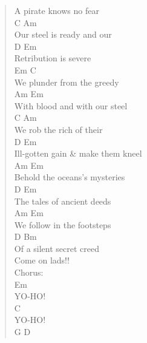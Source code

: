 \documentclass[11pt]{article}
\begin{document}
\begin{verse}
A pirate knows no fear\\
\hspace*{4em}C              Am\\
Our steel is ready and our\\
\hspace*{5em}D            Em\\
Retribution is severe\\
\vspace*{1em}
\vspace*{1em}
\hspace*{3em}Em               C\\
We plunder from the greedy\\
\hspace*{5em}Am                 Em\\
With blood and with our steel\\
\hspace*{3em}C               Am\\
We rob the rich of their\\
\hspace*{11em}D                Em\\
Ill-gotten gain \& make them kneel\\
\vspace*{1em}
\hspace*{2em}Am                    Em\\
Behold the oceans's mysteries\\
\hspace*{4em}D                Em\\
The tales of ancient deeds\\
\hspace*{3em}Am            Em\\
We follow in the footsteps\\
\hspace*{5em}D             Bm\\
Of a silent secret creed\\
\vspace*{1em}
Come on lads!!\\
\vspace*{1em}
Chorus:\\
\hspace*{3em}Em\\
YO-HO!\\
\hspace*{3em}C\\
YO-HO!\\
\hspace*{3em}G               D\\

\end{verse}
\end{document}
